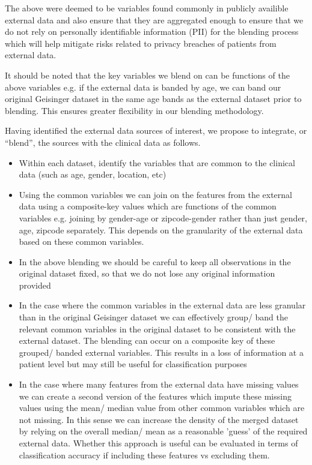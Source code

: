 \documentclass{article}
\begin{document}
\noindent The above were deemed to be variables found commonly in publicly availible 
external data and also ensure that they are aggregated enough to ensure that we
do not rely on personally identifiable information (PII) for the blending process
which will help mitigate risks related to privacy breaches of patients from 
external data.

\noindent It should be noted that the key variables we blend on can be functions 
of the above variables e.g. if the external data is banded by age, we can band 
our original Geisinger dataset in the same age bands as the external dataset prior 
to blending. This ensures greater flexibility in our blending methodology.

\noindent Having identified the external data sources of interest, we propose 
to integrate, or “blend”, the sources with the clinical data as follows.

\begin{itemize}
  \item  Within each dataset, identify the variables that are common to the 
         clinical data (such as age, gender, location, etc)
  \item  Using the common variables we can join on the features from the 
         external data using a composite-key values which are functions of the 
         common variables e.g. joining by gender-age or zipcode-gender 
         rather than just gender, age, zipcode separately. This depends on the 
         granularity of the external data based on these common variables.
  \item  In the above blending we should be careful to keep all observations in
         the original dataset fixed, so that we do not lose any original 
         information provided
  \item  In the case where the common variables in the external data are less 
         granular than in the original Geisinger dataset we can effectively group/ band 
         the relevant common variables in the original dataset to be consistent
         with the external dataset. The blending can occur on a composite key of 
         these grouped/ banded external variables. This results in a loss of 
         information at a patient level but may still be useful for classification
         purposes
  \item  In the case where many features from the external data have missing values
         we can create a second version of the features which impute these missing 
         values using the mean/ median value from other common variables which 
         are not missing. In this sense we can increase the density of the merged 
         dataset by relying on the overall median/ mean as a reasonable 'guess'
         of the required external data. Whether this approach is useful can be
         evaluated in terms of classification accuracy if including these features 
         vs excluding them.
\end{itemize}
\end{document}
